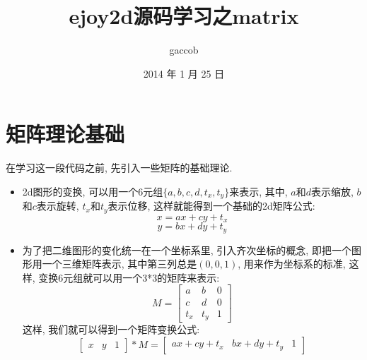 

\title {\ZHH \huge ejoy2d源码学习之matrix}
\author {\small gaccob}
\date {\small 2014 年 1 月 25 日}
\maketitle

\vspace {10pt}
\section{\Large \ZHH 矩阵理论基础} {
    { 在学习这一段代码之前, 先引入一些矩阵的基础理论. }

    \begin {itemize}

    \item {
        2d图形的变换, 可以用一个6元组$\{a, b, c, d, t_x, t_y\}$来表示, 其中, $a$和$d$表示缩放, $b$和$c$表示旋转, $t_x$和$t_y$表示位移, 这样就能得到一个基础的2d矩阵公式:
        \begin{equation}\label{raw1}
            x = ax + cy + t_x
        \end{equation}
        \begin{equation}\label{raw2}
            y = bx + dy + t_y
        \end{equation}
    }

    \item {
        为了把二维图形的变化统一在一个坐标系里, 引入齐次坐标的概念, 即把一个图形用一个三维矩阵表示, 其中第三列总是$(0,0,1)$, 用来作为坐标系的标准, 这样, 变换6元组就可以用一个3*3的矩阵来表示:
         \begin{equation}\label{matrix}
            M =
            \begin{bmatrix}
                a & b & 0 \\
                c & d & 0 \\
                t_x & t_y & 1
            \end{bmatrix}
        \end{equation}
        这样, 我们就可以得到一个矩阵变换公式:
        \begin{equation}\label{transform}
            \begin{bmatrix}
                x & y & 1
            \end{bmatrix}
            * M =
            \begin{bmatrix}
                ax + cy + t_x & bx + dy + t_y & 1
            \end{bmatrix}
        \end{equation}
    }


\end{itemize}}
